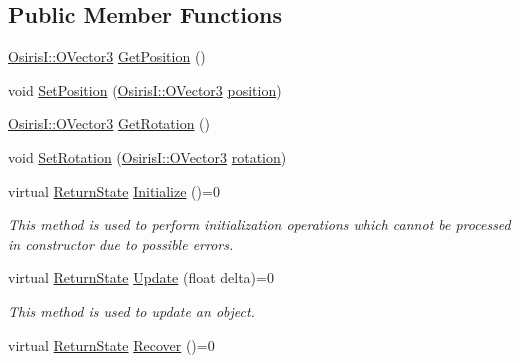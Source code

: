 \subsection*{Public Member Functions}
\begin{DoxyCompactItemize}
\item 
\hyperlink{struct_osiris_i_1_1_o_vector3}{Osiris\-I\-::\-O\-Vector3} \hyperlink{class_osiris_i_1_1_graphics_1_1_components_1_1_i_component_af1175aa265687104f8a08d944b8db0d4}{Get\-Position} ()
\item 
void \hyperlink{class_osiris_i_1_1_graphics_1_1_components_1_1_i_component_af283c7005f46b61cd4cb97b2f68f922b}{Set\-Position} (\hyperlink{struct_osiris_i_1_1_o_vector3}{Osiris\-I\-::\-O\-Vector3} \hyperlink{class_osiris_i_1_1_graphics_1_1_components_1_1_i_component_a2230b1776977acacc269c7adb4beb3bf}{position})
\item 
\hyperlink{struct_osiris_i_1_1_o_vector3}{Osiris\-I\-::\-O\-Vector3} \hyperlink{class_osiris_i_1_1_graphics_1_1_components_1_1_i_component_ab09dc07c491d900fe102f2cbaa29a987}{Get\-Rotation} ()
\item 
void \hyperlink{class_osiris_i_1_1_graphics_1_1_components_1_1_i_component_a2c8044aef291b6d280d14f961e2dea55}{Set\-Rotation} (\hyperlink{struct_osiris_i_1_1_o_vector3}{Osiris\-I\-::\-O\-Vector3} \hyperlink{class_osiris_i_1_1_graphics_1_1_components_1_1_i_component_a0eac7cc547b49676636ef5986539ae4f}{rotation})
\item 
virtual \hyperlink{namespace_osiris_i_a8f53bf938dc75c65c6a529694514013e}{Return\-State} \hyperlink{class_osiris_i_1_1_graphics_1_1_components_1_1_i_component_a5593fe141e2f87a0b234f8011030bb6f}{Initialize} ()=0
\begin{DoxyCompactList}\small\item\em This method is used to perform initialization operations which cannot be processed in constructor due to possible errors. \end{DoxyCompactList}\item 
virtual \hyperlink{namespace_osiris_i_a8f53bf938dc75c65c6a529694514013e}{Return\-State} \hyperlink{class_osiris_i_1_1_graphics_1_1_components_1_1_i_component_a9cda60f3e5f8471742471f239a5180b6}{Update} (float delta)=0
\begin{DoxyCompactList}\small\item\em This method is used to update an object. \end{DoxyCompactList}\item 
virtual \hyperlink{namespace_osiris_i_a8f53bf938dc75c65c6a529694514013e}{Return\-State} \hyperlink{class_osiris_i_1_1_graphics_1_1_components_1_1_i_component_a9e1357894593c0326e963154ecf683a5}{Recover} ()=0

\end{DoxyCompactItemize}
